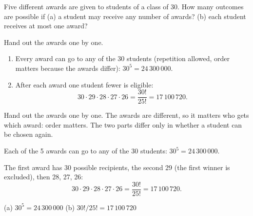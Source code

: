 
\begin{problem}
	Five different awards are given to students of a class of 30. How many
	outcomes are possible if (a) a student may receive any number of awards?
	(b) each student receives at most one award?
\end{problem}

\begin{slides}
	\small
	\exstatement
	\pause
	\sol Hand out the awards one by one.
	\begin{enumerate}
		\item[(a)] Every award can go to any of the 30 students (repetition
		      allowed, order matters because the awards differ):
		      $30^5 = 24\,300\,000$.
		\item[(b)] After each award one student fewer is eligible:
		      \[ 30\cdot29\cdot28\cdot27\cdot26 = \frac{30!}{25!} = 17\,100\,720. \]
	\end{enumerate}
\end{slides}

\begin{solution}
	\idea Hand out the awards one by one. The awards are different, so it
	matters who gets which award: order matters. The two parts differ only in
	whether a student can be chosen again.

	 Each of the 5 awards can go to any of the 30 students:
	$30^5 = 24\,300\,000$.

	 The first award has 30 possible recipients, the second 29 (the
	first winner is excluded), then 28, 27, 26:
	\[ 30\cdot29\cdot28\cdot27\cdot26 = \frac{30!}{25!} = 17\,100\,720. \]
	\begin{answer}
		(a) $30^5=24\,300\,000$ \qquad (b) $30!/25!=17\,100\,720$
	\end{answer}
\end{solution}

